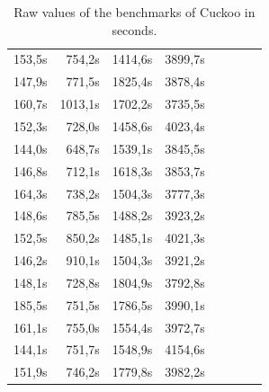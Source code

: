 \documentclass{scrartcl}
\begin{document}
\begin{table}[h]
\begin{tabular}{@{}llllllll@{}}
 \multicolumn{1}{r}{153,5s} & \multicolumn{1}{r}{754,2s} & \multicolumn{1}{r}{1414,6s} & \multicolumn{1}{r}{3899,7s} \\
 \multicolumn{1}{r}{147,9s} & \multicolumn{1}{r}{771,5s} & \multicolumn{1}{r}{1825,4s} & \multicolumn{1}{r}{3878,4s} \\
 \multicolumn{1}{r}{160,7s} & \multicolumn{1}{r}{1013,1s} & \multicolumn{1}{r}{1702,2s} & \multicolumn{1}{r}{3735,5s} \\
 \multicolumn{1}{r}{152,3s} & \multicolumn{1}{r}{728,0s} & \multicolumn{1}{r}{1458,6s} & \multicolumn{1}{r}{4023,4s} \\
 \multicolumn{1}{r}{144,0s} & \multicolumn{1}{r}{648,7s} & \multicolumn{1}{r}{1539,1s} & \multicolumn{1}{r}{3845,5s} \\
 \multicolumn{1}{r}{146,8s} & \multicolumn{1}{r}{712,1s} & \multicolumn{1}{r}{1618,3s} & \multicolumn{1}{r}{3853,7s} \\
 \multicolumn{1}{r}{164,3s} & \multicolumn{1}{r}{738,2s} & \multicolumn{1}{r}{1504,3s} & \multicolumn{1}{r}{3777,3s} \\
 \multicolumn{1}{r}{148,6s} & \multicolumn{1}{r}{785,5s} & \multicolumn{1}{r}{1488,2s} & \multicolumn{1}{r}{3923,2s} \\
 \multicolumn{1}{r}{152,5s} & \multicolumn{1}{r}{850,2s} & \multicolumn{1}{r}{1485,1s} & \multicolumn{1}{r}{4021,3s} \\
 \multicolumn{1}{r}{146,2s} & \multicolumn{1}{r}{910,1s} & \multicolumn{1}{r}{1504,3s} & \multicolumn{1}{r}{3921,2s} \\
 \multicolumn{1}{r}{148,1s} & \multicolumn{1}{r}{728,8s} & \multicolumn{1}{r}{1804,9s} & \multicolumn{1}{r}{3792,8s} \\
 \multicolumn{1}{r}{185,5s} & \multicolumn{1}{r}{751,5s} & \multicolumn{1}{r}{1786,5s} & \multicolumn{1}{r}{3990,1s} \\
 \multicolumn{1}{r}{161,1s} & \multicolumn{1}{r}{755,0s} & \multicolumn{1}{r}{1554,4s} & \multicolumn{1}{r}{3972,7s} \\
 \multicolumn{1}{r}{144,1s} & \multicolumn{1}{r}{751,7s} & \multicolumn{1}{r}{1548,9s} & \multicolumn{1}{r}{4154,6s} \\
 \multicolumn{1}{r}{151,9s} & \multicolumn{1}{r}{746,2s} & \multicolumn{1}{r}{1779,8s} & \multicolumn{1}{r}{3982,2s} \\ \bottomrule
\end{tabular}
\caption{Raw values of the benchmarks of Cuckoo in seconds.}
\label{rawdata_cuckoo}
\end{table}
\end{document}

